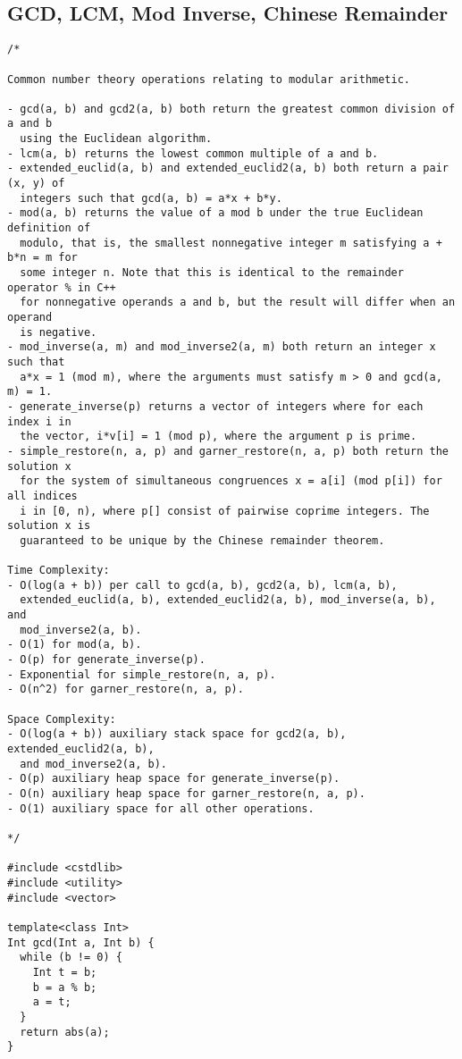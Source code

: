 \subsection{GCD, LCM, Mod Inverse, Chinese Remainder}
\begin{lstlisting}
/*

Common number theory operations relating to modular arithmetic.

- gcd(a, b) and gcd2(a, b) both return the greatest common division of a and b
  using the Euclidean algorithm.
- lcm(a, b) returns the lowest common multiple of a and b.
- extended_euclid(a, b) and extended_euclid2(a, b) both return a pair (x, y) of
  integers such that gcd(a, b) = a*x + b*y.
- mod(a, b) returns the value of a mod b under the true Euclidean definition of
  modulo, that is, the smallest nonnegative integer m satisfying a + b*n = m for
  some integer n. Note that this is identical to the remainder operator % in C++
  for nonnegative operands a and b, but the result will differ when an operand
  is negative.
- mod_inverse(a, m) and mod_inverse2(a, m) both return an integer x such that
  a*x = 1 (mod m), where the arguments must satisfy m > 0 and gcd(a, m) = 1.
- generate_inverse(p) returns a vector of integers where for each index i in
  the vector, i*v[i] = 1 (mod p), where the argument p is prime.
- simple_restore(n, a, p) and garner_restore(n, a, p) both return the solution x
  for the system of simultaneous congruences x = a[i] (mod p[i]) for all indices
  i in [0, n), where p[] consist of pairwise coprime integers. The solution x is
  guaranteed to be unique by the Chinese remainder theorem.

Time Complexity:
- O(log(a + b)) per call to gcd(a, b), gcd2(a, b), lcm(a, b),
  extended_euclid(a, b), extended_euclid2(a, b), mod_inverse(a, b), and
  mod_inverse2(a, b).
- O(1) for mod(a, b).
- O(p) for generate_inverse(p).
- Exponential for simple_restore(n, a, p).
- O(n^2) for garner_restore(n, a, p).

Space Complexity:
- O(log(a + b)) auxiliary stack space for gcd2(a, b), extended_euclid2(a, b),
  and mod_inverse2(a, b).
- O(p) auxiliary heap space for generate_inverse(p).
- O(n) auxiliary heap space for garner_restore(n, a, p).
- O(1) auxiliary space for all other operations.

*/

#include <cstdlib>
#include <utility>
#include <vector>

template<class Int>
Int gcd(Int a, Int b) {
  while (b != 0) {
    Int t = b;
    b = a % b;
    a = t;
  }
  return abs(a);
}


\end{lstlisting}
